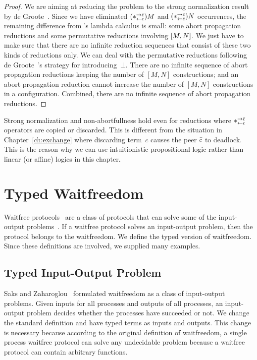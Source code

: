 \begin{proof}
 We are aiming at reducing the problem to the strong normalization result
 by de Groote~\cite{Philippe2002js}.
 Since we have eliminated $(\ast^{\rightarrow {\bar{c}}}_{\leftarrow{c}})M$ and $(\ast^{\rightarrow {c}}_{\leftarrow{\bar{c}}})N$ occurrences,
 the remaining difference from \citet{Philippe2002js}'s lambda calculus
 is small: some abort propagation reductions
 and some permutative reductions involving $[{M,N}]$.
 We just have to make sure that there are no infinite reduction sequences
 that consist of these two kinds of reductions only.
 We can deal with the permutative reductions following de
 Groote~\cite{Philippe2002js}'s strategy for introducing~$\bot$.
 There are no infinite sequence of abort propagation reductions keeping the
 number of $[M,N]$ constructions; and an abort propagation reduction cannot increase
 the number of $[M,N]$ constructions in a configuration.  Combined,
 there are no infinite sequence of abort propagation reductions.
\end{proof}

Strong normalization and non-abortfullness hold even for reductions
where $\ast^{\rightarrow {\bar{c}}}_{\leftarrow{c}}$ operators are copied or discarded.  This is different
from the situation in Chapter~\ref{ch:exchange} where
discarding term~$c$ causes the peer $\bar{c}$ to
deadlock.  This is the reason why we can use intuitionistic
propositional logic rather than linear (or affine) logics in this chapter.



\section{Typed Waitfreedom}
\label{waitfreedom}

Waitfree protocols~\cite{Herlihy88,Saks:1993vq} are a class of protocols
that can solve
some of the input-output problems~\cite{Moran:1987ep,Biran:1988hh}.
If a waitfree protocol solves an input-output problem, then the protocol
belongs to the waitfreedom.
We define the typed version of waitfreedom.
Since these definitions are involved, we supplied many examples.

\subsection{Typed Input-Output Problem}

Saks and Zaharoglou~\cite{Saks:1993vq} formulated waitfreedom as a class
of input-output
problems.
Given inputs for all processes and outputs of all
processes, an input-output problem decides whether the processes have
succeeded or not.
We change the standard definition and have typed terms as inputs and
outputs.
This change is necessary because according to the original definition of
waitfreedom,
a single process waitfree protocol can solve any undecidable problem
because a waitfree protocol can contain arbitrary functions.

